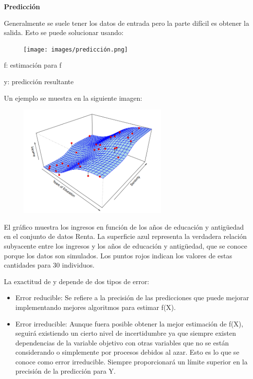 \documentclass[
  letterpaper,
  DIV=11,
  numbers=noendperiod]{scrartcl}
\begin{document}
\textbf{Predicción}

Generalmente se suele tener los datos de entrada pero la parte difícil
es obtener la salida. Esto se puede solucionar usando:

\begin{figure}

{\centering \texttt{[image: images/predicción.png]}

}

\end{figure}

f: estimación para f

y: predicción resultante

Un ejemplo se muestra en la siguiente imagen:

\begin{figure}

{\centering \includegraphics[width=2.94792in,height=\textheight]{images/imagen prediccion.png}

}

\end{figure}

El gráfico muestra los ingresos en función de los años de educación y
antigüedad en el conjunto de datos Renta. La superficie azul representa
la verdadera relación subyacente entre los ingresos y los años de
educación y antigüedad, que se conoce porque los datos son simulados.
Los puntos rojos indican los valores de estas cantidades para 30
individuos.

La exactitud de y depende de dos tipos de error:

\begin{itemize}
\item
  Error reducible: Se refiere a la precisión de las predicciones que
  puede mejorar implementando mejores algoritmos para estimar f(X).
\item
  Error irreducible: Aunque fuera posible obtener la mejor estimación de
  f(X), seguirá existiendo un cierto nivel de incertidumbre ya que
  siempre existen dependencias de la variable objetivo con otras
  variables que no se están considerando o simplemente por procesos
  debidos al azar. Esto es lo que se conoce como error irreducible.
  Siempre proporcionará un límite superior en la precisión de la
  predicción para Y.
\end{itemize}
\end{document}
